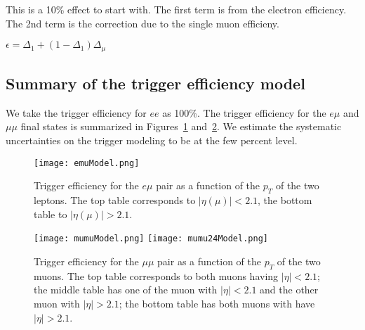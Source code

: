 This is a 10\% effect to start with.  
The first term is from the electron efficiency.  The 2nd term is the correction
due to the single muon efficieny. 

\begin{center}
$\epsilon = \Delta_1 + (1-\Delta_1)\Delta_{\mu}$
\end{center}

\subsection{Summary of the trigger efficiency model}
\label{sec:trgeffsum}

We take the trigger efficiency for $ee$ as 100\%.  The trigger efficiency
for the $e\mu$ and $\mu\mu$ final states is summarized in 
Figures~\ref{fig:emuModel} and~\ref{fig:mumuModel}.
We estimate the systematic uncertainties on the trigger modeling 
to be at the few percent level.

\begin{figure}[htb]
\begin{center}
\texttt{[image: emuModel.png]}
\caption{\label{fig:emuModel}\protect Trigger efficiency for the
$e\mu$ pair as a function of the $p_T$ of the two leptons.
The top table corresponds to $|\eta(\mu)| < 2.1$, the bottom
table to $|\eta(\mu)| > 2.1$.} 
\end{center}
\end{figure}
\clearpage


\begin{figure}[tbh]
\begin{center}
\texttt{[image: mumuModel.png]}
\texttt{[image: mumu24Model.png]}
\caption{\label{fig:mumuModel}\protect Trigger efficiency for the
$\mu\mu$ pair as a function of the $p_T$ of the two muons.
The top table corresponds to both muons having $|\eta| < 2.1$;
the middle table has one of the muon with $|\eta|<2.1$ and the
other muon with $|\eta|>2.1$; the bottom table has both muons with 
have $|\eta|>2.1$.}
\end{center}
\end{figure}

\clearpage